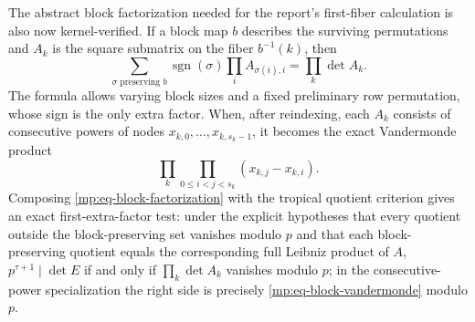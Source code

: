 \documentclass[11pt,oneside]{article}
\theoremstyle{definition}
\theoremstyle{remark}
\begin{document}
The abstract block factorization needed for the report's first-fiber calculation is also now
kernel-verified.  If a block map $b$ describes the surviving permutations and $A_k$ is the
square submatrix on the fiber $b^{-1}(k)$, then
\begin{equation}
 \sum_{\sigma\text{ preserving }b}
   \operatorname{sgn}(\sigma)\prod_i A_{\sigma(i),i}
 =\prod_k\det A_k.
 \label{mp:eq-block-factorization}
\end{equation}
The formula allows varying block sizes and a fixed preliminary row permutation, whose sign is
the only extra factor.  When, after reindexing, each $A_k$ consists of consecutive powers of
nodes $x_{k,0},\ldots,x_{k,s_k-1}$, it becomes the exact Vandermonde product
\begin{equation}
 \prod_k\prod_{0\le i<j<s_k}(x_{k,j}-x_{k,i}).
 \label{mp:eq-block-vandermonde}
\end{equation}
Composing \eqref{mp:eq-block-factorization} with the tropical quotient criterion gives an
exact first-extra-factor test: under the explicit hypotheses that every quotient outside the
block-preserving set vanishes modulo $p$ and that each block-preserving quotient equals the
corresponding full Leibniz product of $A$,
$p^{\tau+1}\mid\det E$ if and only if $\prod_k\det A_k$ vanishes modulo $p$; in the
consecutive-power specialization the right side is precisely
\eqref{mp:eq-block-vandermonde} modulo $p$.
\end{document}
